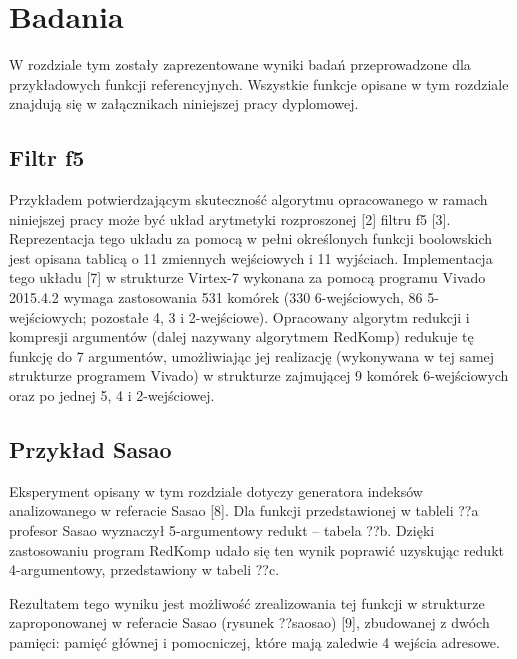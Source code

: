 \chapter{Badania}
\label{chapter:research}

W rozdziale tym zostały zaprezentowane wyniki badań przeprowadzone dla przykładowych funkcji referencyjnych.
Wszystkie funkcje opisane w tym rozdziale znajdują się w załącznikach niniejszej pracy dyplomowej.

\section{Filtr f5}

Przykładem potwierdzającym skuteczność algorytmu opracowanego w ramach niniejszej pracy
może być układ arytmetyki rozproszonej [2] filtru f5 [3].
Reprezentacja tego układu za pomocą w pełni określonych funkcji boolowskich
jest opisana tablicą o 11 zmiennych wejściowych i 11 wyjściach.
Implementacja tego układu [7] w strukturze Virtex-7 wykonana za pomocą programu Vivado 2015.4.2
wymaga zastosowania 531 komórek (330 6-wejściowych, 86 5-wejściowych; pozostałe 4, 3 i 2-wejściowe).
Opracowany algorytm redukcji i kompresji argumentów (dalej nazywany algorytmem RedKomp)
redukuje tę funkcję do 7 argumentów,
umożliwiając jej realizację
(wykonywana w tej samej strukturze programem Vivado)
w strukturze zajmującej 9 komórek 6-wejściowych oraz po jednej 5, 4 i 2-wejściowej.

\section{Przykład Sasao}

Eksperyment opisany w tym rozdziale dotyczy generatora indeksów analizowanego w referacie Sasao [8].
Dla funkcji przedstawionej w tableli ??a profesor Sasao wyznaczył 5-argumentowy redukt – tabela ??b.
Dzięki zastosowaniu program RedKomp udało się ten wynik poprawić uzyskując redukt 4-argumentowy,
przedstawiony w tabeli ??c.

Rezultatem tego wyniku jest możliwość zrealizowania tej funkcji w strukturze zaproponowanej w referacie Sasao (rysunek ??saosao) [9],
zbudowanej z dwóch pamięci: pamięć głównej i pomocniczej,
które mają zaledwie 4 wejścia adresowe.

